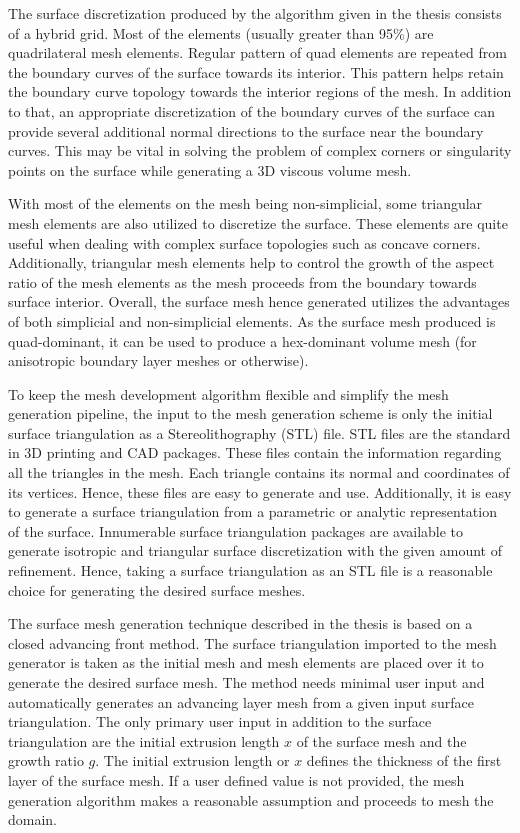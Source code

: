 The surface discretization produced by the algorithm given in the thesis consists of a hybrid grid. Most of the elements (usually greater than 95\%) are quadrilateral mesh elements. Regular pattern of quad elements are repeated from the boundary curves of the surface towards its interior. This pattern helps retain the boundary curve topology towards the interior regions of the mesh. In addition to that, an appropriate discretization of the boundary curves of the surface can provide several additional normal directions to the surface near the boundary curves. This may be vital in solving the problem of complex corners or singularity points on the surface while generating a 3D viscous volume mesh.

With most of the elements on the mesh being non-simplicial, some triangular mesh elements are also utilized to discretize the surface. These elements are quite useful when dealing with complex surface topologies such as concave corners. Additionally, triangular mesh elements help to control the growth of the aspect ratio of the mesh elements as the mesh proceeds from the boundary towards surface interior. Overall, the surface mesh hence generated utilizes the advantages of both simplicial and non-simplicial elements. As the surface mesh produced is quad-dominant, it can be used to produce a hex-dominant volume mesh (for anisotropic boundary layer meshes or otherwise).

To keep the mesh development algorithm flexible and simplify the mesh generation pipeline, the input to the mesh generation scheme is only the initial surface triangulation as a Stereolithography (STL) file. STL files are the standard in 3D printing and CAD packages. These files contain the information regarding all the triangles in the mesh. Each triangle contains its normal and coordinates of its vertices. Hence, these files are easy to generate and use. Additionally, it is easy to generate a surface triangulation from a parametric or analytic representation of the surface. Innumerable surface triangulation packages are available to generate isotropic and triangular surface discretization with the given amount of refinement. Hence, taking a surface triangulation as an STL file is a reasonable choice for generating the desired surface meshes.

The surface mesh generation technique described in the thesis is based on a closed advancing front method. The surface triangulation imported to the mesh generator is taken as the initial mesh and mesh elements are placed over it to generate the desired surface mesh. The method needs minimal user input and automatically generates an advancing layer mesh from a given input surface triangulation. The only primary user input in addition to the surface triangulation are the initial extrusion length $x$ of the surface mesh and the growth ratio $g$. The initial extrusion length or $x$ defines the thickness of the first layer of the surface mesh. If a user defined value is not provided, the mesh generation algorithm makes a reasonable assumption and proceeds to mesh the domain. 


